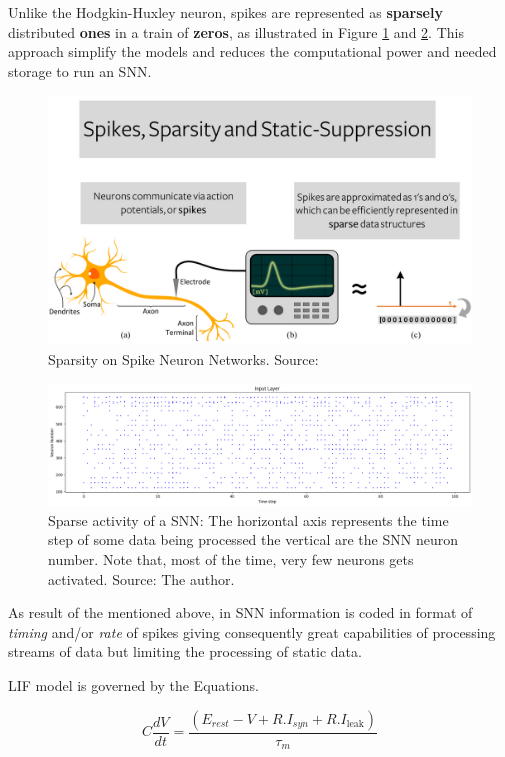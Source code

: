 			\par Unlike the Hodgkin-Huxley neuron, spikes are represented as \textbf{sparsely} distributed \textbf{ones} in a train of \textbf{zeros}, as illustrated in Figure \ref{fig:spikessparsitystaticsupress} and \ref{fig:sparsity}. This approach simplify the models and reduces the computational power and needed storage to run an SNN.
			
			\begin{figure}[H]
				\centering
				\includegraphics[width=0.6\linewidth]{images/spikesSparsityStaticSupress}
				\caption{Sparsity on Spike Neuron Networks. Source: \cite{10242251}}
				\label{fig:spikessparsitystaticsupress}
			\end{figure}
			
			\begin{figure}[H]
				\centering
				\includegraphics[width=.8\linewidth]{images/sparsity}
				\caption[Sparse activity of a SNN]{Sparse activity of a SNN: The horizontal axis represents the time step of some data being processed the vertical are the SNN neuron number. Note that, most of the time, very few neurons gets activated. Source: The author.}
				\label{fig:sparsity}
			\end{figure}
				
			\par As result of the mentioned above, in SNN information is coded in format of \textit{timing} and/or \textit{rate} of spikes giving consequently great capabilities of processing streams of data but limiting the processing of static data.
			
			\par LIF model is governed by the Equations.
			
			\begin{equation}
				C \frac{dV}{dt} = \frac{(E_{rest} - V + R . I_{syn} + R . I_{\text{leak}})}{\tau_m}
			\end{equation}
		
